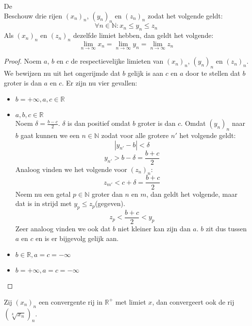 \documentclass[main.tex]{subfiles}
\begin{document}
\begin{bst}
  \label{st:insluitstelling}
  De \\
  Beschouw drie rijen $(x_{n})_{n}$, $(y_{n})_{n}$ en $(z_{n})_{n}$ zodat het volgende geldt:
  \[ \forall n\in \mathbb{N}: x_{n}\le y_{n}\le z_{n} \]
  Als $(x_{n})_{n}$ en $(z_{n})_{n}$ dezelfde limiet hebben, dan geldt het volgende:
  \[ \lim_{n\rightarrow \infty}x_{n} = \lim_{n\rightarrow \infty}y_{n} = \lim_{n\rightarrow \infty}z_{n} \]

  \begin{proof}
    Noem $a$, $b$ en $c$ de respectievelijke limieten van $(x_{n})_{n}$, $(y_{n})_{n}$ en $(z_{n})_{n}$.
    We bewijzen nu uit het ongerijmde dat $b$ gelijk is aan $c$ en $a$ door te stellen dat $b$ groter is dan $a$ en $c$.
    Er zijn nu vier gevallen:
    \begin{itemize}
    \item $b = +\infty, a,c \in \mathbb{R}$\\
    \item $a,b,c\in \mathbb{R}$\\
      Noem $\delta = \frac{b-c}{2}$.
      $\delta$ is dan positief omdat $b$ groter is dan $c$.
      Omdat $(y_{n})_{n}$ naar $b$ gaat kunnen we een $n\in \mathbb{N}$ zodat voor alle grotere $n'$ het volgende geldt:
      \[ |y_{n'}-b|<\delta \]
      \[ y_{n'} > b - \delta = \frac{b+c}{2} \]
      Analoog vinden we het volgende voor $(z_{n})_{n}$:
      \[ z_{m'} < c+\delta = \frac{b+c}{2} \]
      Neem nu een getal $p\in \mathbb{N}$ groter dan $n$ en $m$, dan geldt het volgende, maar dat is in strijd met $y_{p} \le z_{p}$(gegeven).
      \[ z_{p} < \frac{b+c}{2} < y_{p} \]
      Zeer analoog vinden we ook dat $b$ niet kleiner kan zijn dan $a$.
      $b$ zit dus tussen $a$ en $c$ en is er bijgevolg gelijk aan.
    \item $b\in \mathbb{R}, a=c = -\infty$\\
    \item $b= +\infty, a=c=-\infty$\\
    \end{itemize}
  \end{proof}
\end{bst}


\begin{st}
  Zij $(x_{n})_{n}$ een convergente rij in $\mathbb{R}^{+}$ met limiet $x$, dan convergeert ook de rij $\left(\sqrt[k]{x_{n}}\right)_{n}$.

\end{st}
\end{document}
